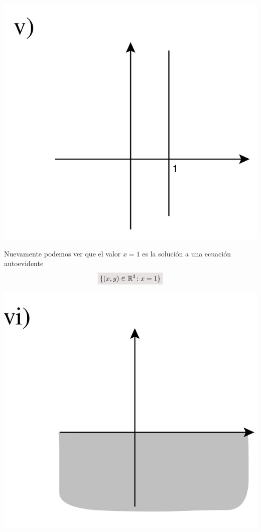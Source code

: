 \documentclass[a4paper,11pt]{article}
\newcommand{\real}{\mathbb{R}}
\newcommand{\resalta}[1]{\colorbox{g}{$\displaystyle #1$}}
\begin{document}
\begin{enumerate}
\begin{enumerate}[label = \roman*)]
\begin{minipage}[c]{0.3\linewidth}
                \centering
                    \includegraphics[scale=0.15]{4ii-5}
            \end{minipage}
            \begin{minipage}[c]{0.7\linewidth}
               Nuevamente podemos ver que el valor $x=1$ es la soluci\'on a una ecuaci\'on autoevidente
                \begin{equation}
                    \notag \resalta{\{(x,y)\in \real^{2} \colon x=1\}}
                \end{equation}
            \end{minipage}
            \begin{minipage}[c]{0.3\linewidth}
                \centering
                    \includegraphics[scale=0.15]{4ii-6}

\end{minipage}
\end{enumerate}
\end{enumerate}
\end{document}
